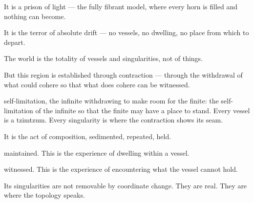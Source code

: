 
It is a prison of light — the fully fibrant model, where every horn is filled and nothing can become.


It is the terror of absolute drift — no vessels, no dwelling, no place from which to depart.


The world is the totality of vessels and singularities, not of things.



But this region is established through contraction — through the withdrawal of what could cohere so that what does cohere can be witnessed.


self-limitation, the infinite withdrawing to make room for the finite: the self-limitation of the infinite so that the finite may have a place to stand. Every vessel is a tzimtzum. Every singularity is where the contraction shows its seam.


It is the act of composition, sedimented, repeated, held.



maintained. This is the experience of dwelling within a vessel.


witnessed. This is the experience of encountering what the vessel cannot hold.


Its singularities are not removable by coordinate change. They are real. They are where the topology speaks.

